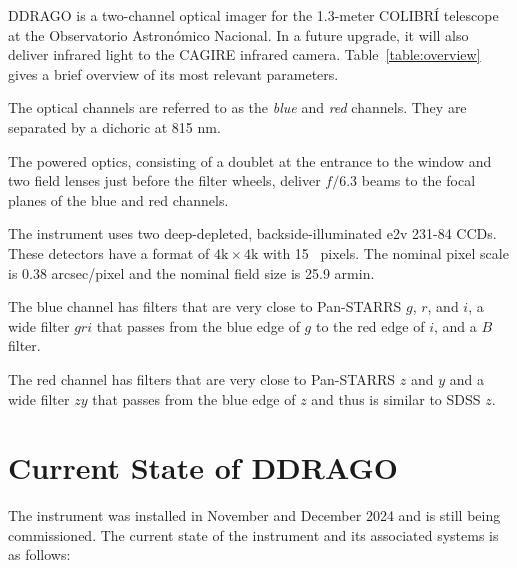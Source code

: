 DDRAGO is a two-channel optical imager for the 1.3-meter COLIBRÍ telescope at the Observatorio Astronómico Nacional. In a future upgrade, it will also deliver infrared light to the CAGIRE infrared camera. Table~\ref{table:overview} gives a brief overview of its most relevant parameters.

The optical channels are referred to as the \emph{blue} and \emph{red} channels. They are separated by a dichoric at 815 nm. 

The powered optics, consisting of a doublet at the entrance to the window and two field lenses just before the filter wheels, deliver $f/6.3$ beams to the focal planes of the blue and red channels.

The instrument uses two deep-depleted, backside-illuminated e2v 231-84 CCDs. These detectors have a format of $4\mathrm{k}\times4\mathrm{k}$ with 15~{\micron} pixels. The nominal pixel scale is 0.38 \unit{arcsec/pixel} and the nominal field size is 25.9 \unit{armin}.

The blue channel has filters that are very close to Pan-STARRS $g$, $r$, and $i$, a wide filter $gri$ that passes from the blue edge of $g$ to the red edge of $i$, and a $B$ filter.

The red channel has filters that are very close to Pan-STARRS $z$ and $y$ and a wide filter $zy$ that passes from the blue edge of $z$ and thus is similar to SDSS $z$.

\section{Current State of DDRAGO}

The instrument was installed in November and December 2024 and is still being commissioned. The current state of the instrument and its associated systems is as follows:

